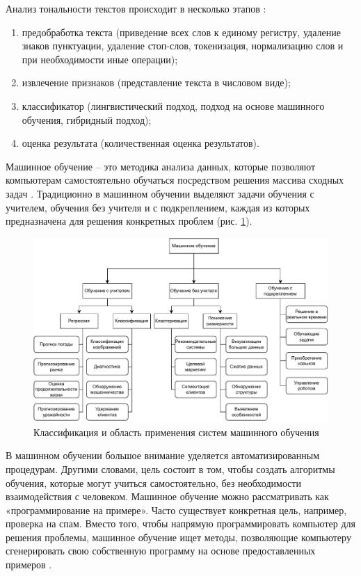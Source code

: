 \documentclass[a4paper,14pt, unknownkeysallowed]{extreport}
\begin{document}
Анализ тональности текстов происходит в несколько этапов \cite{Dvoinikova}:
\begin{enumerate}
	\item предобработка текста (приведение всех слов к единому регистру, удаление знаков пунктуации, удаление стоп-слов, токенизация, нормализацию слов и при необходимости иные операции);
	\item извлечение признаков (представление текста в числовом виде);
	\item классификатор (лингвистический подход, подход на основе машинного обучения, гибридный подход);
	\item оценка результата (количественная оценка результатов).
\end{enumerate}

Машинное обучение -- это методика анализа данных, которые позволяют компьютерам самостоятельно обучаться посредством решения массива сходных задач \cite{Poletaeva}. Традиционно в машинном обучении выделяют задачи обучения с учителем, обучения без учителя и с подкреплением, каждая из которых предназначена для решения конкретных проблем (рис. \ref{ml_classes}).

\begin{figure}[H]
	\centering
	\includegraphics[scale=0.85]{imgs/ml_classes.pdf}
	\caption{Классификация и область применения систем машинного обучения}
	\label{ml_classes}
\end{figure}

В машинном обучении большое внимание уделяется автоматизированным процедурам. Другими словами, цель состоит в том, чтобы создать алгоритмы обучения, которые могут учиться самостоятельно, без необходимости взаимодействия с человеком. Машинное обучение можно рассматривать как «программирование на примере». Часто существует конкретная цель, например, проверка на спам. Вместо того, чтобы напрямую программировать компьютер для решения проблемы, машинное обучение ищет методы, позволяющие компьютеру сгенерировать свою собственную программу на основе предоставленных примеров \cite{Alhanov}.
\end{document}
